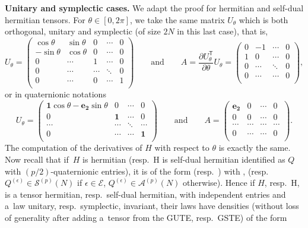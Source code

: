 \documentclass[pdftex]{sigma}
\newcommand{\AND}{\qquad \mathrm{and} \qquad}
\numberwithin{equation}{section}
\theoremstyle{definition}
\begin{document}
{\bf Unitary and symplectic cases.}
We adapt the proof for hermitian and self-dual hermitian tensors. For $\theta \in [0,2\pi]$, we take the same matrix $U_{\theta}$ which is both orthogonal, unitary and symplectic (of size $2N$ in this last case), that is,
\[U_{\theta}=\begin{pmatrix}
    \cos{\theta} & \sin{\theta} & 0 & \cdots & 0 \\
    -\sin{\theta} & \cos\theta & 0 & \cdots & 0 \\
    0 & \cdots & 1 & \cdots & 0 \\
    0 & \cdots & \cdots & \ddots & 0 \\
    0 & \cdots & 0 & \cdots & 1 \\
\end{pmatrix}
\AND
A= \frac{\partial U_{\theta}^{\mathsf T}}{\partial \theta} U_{\theta} = \begin{pmatrix}
    0 & -1 &  \cdots & 0 \\
    1 & 0 &  \cdots & 0 \\
    0 & \cdots & \ddots & 0 \\
    0 & \cdots  & \cdots & 0 \\
\end{pmatrix},\]
or in quaternionic notations
\[U_{\theta}=\begin{pmatrix}
    \mathbf{1} \cos{\theta} - \mathbf{e_2} \sin{\theta} & 0 & \cdots & 0 \\
    0 & \mathbf{1} & \cdots & 0 \\
    \cdots & \cdots & \ddots & \cdots \\
    0 & \cdots &  \cdots & \mathbf{1} \\
\end{pmatrix}
\AND
A = \begin{pmatrix}
    \mathbf{e_2} & 0 &  \cdots & 0 \\
    0 & 0 &  \cdots & 0 \\
    \cdots & \cdots & \cdots & \cdots \\
    0 & \cdots  & \cdots & 0 \\
\end{pmatrix}.\]
The computation of the derivatives of $H$ with respect to $\theta$ is exactly the same. Now recall that if~$H$ is hermitian (resp.\ $\mathrm{H}$ is self-dual hermitian identified as $Q$ with $(p/2)$-quaternionic entries), it is of the form  \big(resp.\ \big) with ,  \big(resp.\ $Q^{(\epsilon)} \in \mathcal{S}^{(p)}(N)$ if $\epsilon \in \mathcal{E}$, $Q^{(\epsilon)} \in \mathcal{A}^{(p)}(N)$ otherwise\big). Hence if $H$, resp.~$\mathrm{H}$, is a tensor hermitian, resp.\ self-dual hermitian, with independent entries and a~law unitary, resp.\ symplectic, invariant, their laws have densities (without loss of generality after adding a~tensor from the GUTE, resp.\ GSTE) of the form
\end{document}
